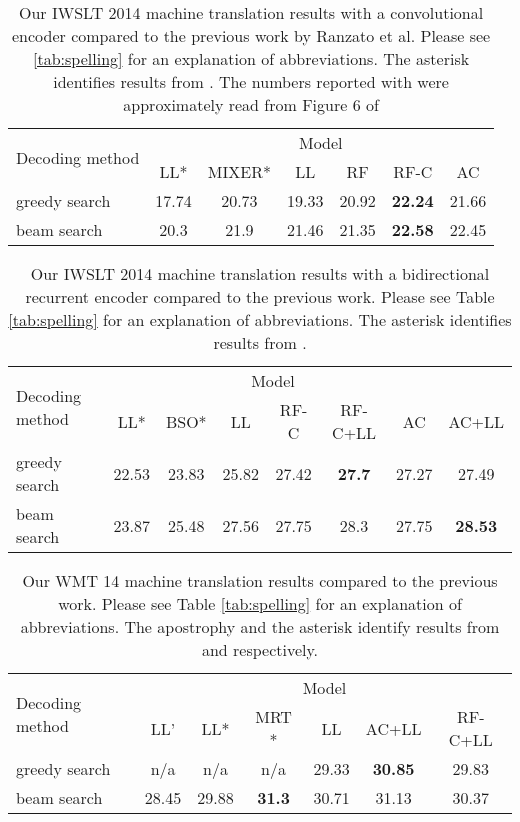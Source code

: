 \documentclass{article} \usepackage{iclr2017_conference,times}
\begin{document}
\begin{table}\centering
    \caption{Our IWSLT 2014 machine translation results with a convolutional encoder compared to the previous work by Ranzato et al.
    Please see \ref{tab:spelling} for an explanation of abbreviations. The asterisk
    identifies results from \citep{ranzato2015sequence}. 
    The numbers reported with  were approximately read from
    Figure 6 of \citep{ranzato2015sequence} }
    \begin{tabular}{l | c | c | c | c | c | c}
        \multirow{2}{*}{Decoding method} & \multicolumn{6}{|c}{Model} \\
                                         & LL* & MIXER* & LL & RF & RF-C & AC \\
        \hline\hline
        greedy search & 17.74       & 20.73       & 19.33 & 20.92 & \textbf{22.24} & 21.66 \\
        beam search   &  20.3 &  21.9 & 21.46 & 21.35 & \textbf{22.58} & 22.45 
    \end{tabular}
    \label{tab:mt}
\end{table}

\begin{table}\centering
    \caption{
        Our IWSLT 2014 machine translation results with a bidirectional recurrent encoder compared to the previous work.
        Please see Table \ref{tab:spelling} for an explanation of abbreviations. The asterisk
        identifies results from \citep{wiseman2016sequence}. 
    }
    \begin{tabular}{l | c | c | c | c | c | c | c}
        \multirow{2}{*}{Decoding method} & \multicolumn{6}{|c}{Model} \\
                                         & LL* & BSO* & LL & RF-C & RF-C+LL & AC & AC+LL \\
        \hline\hline
        greedy search & 22.53 & 23.83 & 25.82 & 27.42 & \textbf{27.7} & 27.27 & 27.49\\
        beam search   & 23.87 & 25.48 & 27.56 & 27.75 & 28.3 & 27.75 & \textbf{28.53}
    \end{tabular}
    \label{tab:mt2}
\end{table}

\begin{table}\centering
    \caption{
        Our WMT 14 machine translation results compared to the previous work.
        Please see Table \ref{tab:spelling} for an explanation of
        abbreviations. The apostrophy and the asterisk identify results from
        \citep{bahdanau2015neural} and \citep{shen2015minimum} respectively.
    }
    \begin{tabular}{l | c | c | c | c | c | c}
        \multirow{2}{*}{Decoding method} & \multicolumn{6}{|c}{Model} \\
                                         & LL' & LL* & MRT * & LL & AC+LL & RF-C+LL \\
        \hline\hline
        greedy search & n/a & n/a & n/a & 29.33 & \textbf{30.85} & 29.83\\
        beam search   & 28.45 & 29.88 & \textbf{31.3} & 30.71 & 31.13 & 30.37
    \end{tabular}
    \label{tab:wmt}
\end{table}
\end{document}
